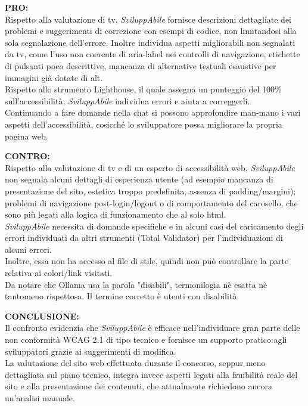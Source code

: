 \vspace{0.5cm}
\noindent \textbf{PRO:}\\
\noindent Rispetto alla valutazione di \acrshort{tv}, \textit{SviluppAbile} fornisce descrizioni dettagliate dei problemi e suggerimenti di correzione con esempi di codice, non limitandosi alla sola segnalazione dell’errore. Inoltre individua aspetti migliorabili non segnalati da \acrshort{tv}, come l’uso non coerente di aria-label nei controlli di navigazione, etichette di pulsanti poco descrittive, mancanza di alternative testuali esaustive per immagini già dotate di alt.\\
Rispetto allo strumento Lighthouse, il quale assegna un punteggio del 100\% sull'accessibilità, \textit{SviluppAbile} individua errori e aiuta a correggerli.\\
Continuando a fare domande nella chat si possono approfondire man-mano i vari aspetti dell’accessibilità, cosicché lo sviluppatore possa migliorare la propria pagina web.

\vspace{0.5cm}
\noindent \textbf{CONTRO:}\\
\noindent Rispetto alla valutazione di \acrshort{tv} e di un esperto di accessibilità web, \textit{SviluppAbile} non segnala alcuni dettagli di esperienza utente (ad esempio mancanza di presentazione del sito, estetica troppo predefinita, assenza di padding/margini); problemi di navigazione post-login/logout o di comportamento del carosello, che sono più legati alla logica di funzionamento che al solo \acrshort{html}.\\
\textit{SviluppAbile} necessita di domande specifiche e in alcuni casi del caricamento degli errori individuati da altri strumenti (Total Validator) per l’individuazioni di alcuni errori.\\
Inoltre, essa non ha accesso al file di stile, quindi non può controllare la parte relativa ai colori/link visitati.\\
Da notare che Ollama usa la parola "disabili", termonilogia nè esatta nè tantomeno rispettosa. Il termine corretto è utenti con disabilità.

\vspace{0.5cm}
\noindent \textbf{CONCLUSIONE:}\\
\noindent Il confronto evidenzia che \textit{SviluppAbile} è efficace nell’individuare gran parte delle non conformità WCAG 2.1 di tipo tecnico e fornisce un supporto pratico agli sviluppatori grazie ai suggerimenti di modifica.\\
La valutazione del sito web effettuata durante il concorso, seppur meno dettagliata sul piano tecnico, integra invece aspetti legati alla fruibilità reale del sito e alla presentazione dei contenuti, che attualmente richiedono ancora un’analisi manuale.

